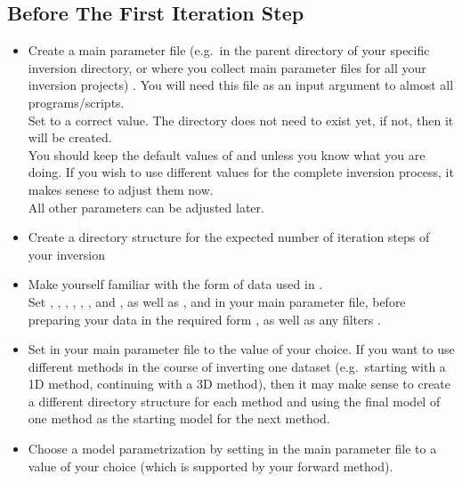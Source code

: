 \subsection*{Before The First Iteration Step}
%
\begin{itemize}
\item Create a main parameter file (e.g.\ in the parent directory of your specific inversion directory, 
or where you collect main parameter files for all your inversion projects)
. You will need this file as an input argument to almost all programs/scripts.\\
Set  to a correct value. 
The directory does not need to exist yet, if not, then it will be created. \\
You should keep the default values of  and  unless
you know what you are doing. If you wish to use different values for the complete inversion process, 
it makes senese to adjust them now.\\
All other parameters can be adjusted later. 
%
\item Create a directory structure for the expected number of iteration steps of your inversion 
%
\item Make yourself familiar with the form of data used in \ASKI{} . \\
  Set , , , 
  , , 
  , and , as well as , 
   and   in your main 
  parameter file, before preparing your data in the required form , 
  as well as any filters .
%
\item Set  in your main 
parameter file to the value of your choice. If you want to use different methods in the course of 
inverting one dataset (e.g.\ starting with a 1D method, continuing with a 3D method), then it may make 
sense to create a different directory structure for each method and using the final model of one method
as the starting model for the next method.
%
\item Choose a model parametrization by setting  in the main parameter file 
to a value of your choice (which is supported by your forward method).
%
\end{itemize}
%
